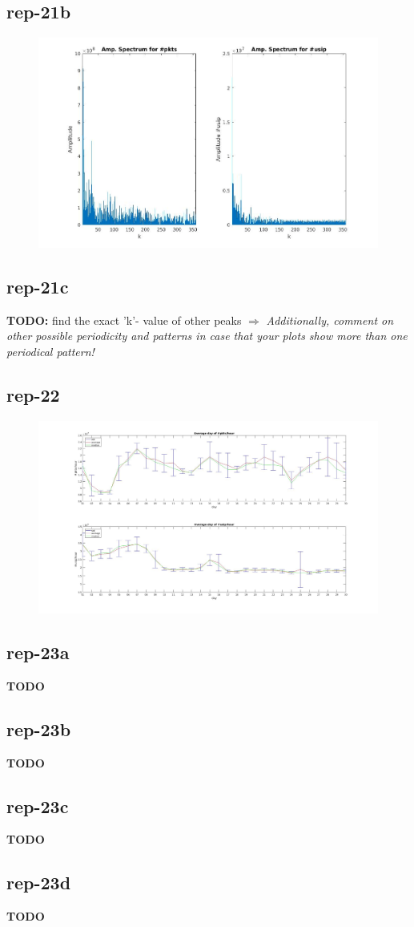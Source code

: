 \subsection*{rep-21b}
\begin{figure}[H]
\center
\includegraphics[width=.7\textwidth]{./chapters/plots/rep21b.jpg}\\
\caption{}
\end{figure}

\subsection*{rep-21c}
\textbf{TODO:} find the exact 'k'- value of other peaks $\Rightarrow$ \textit{Additionally, comment on other possible periodicity and patterns in case that your plots show more than one periodical pattern!}
\subsection*{rep-22}
\begin{figure}[H]
\center
\includegraphics[width=1\textwidth]{./chapters/plots/rep-22.jpg}\\
\caption{}
\end{figure}

\subsection*{rep-23a}
\textbf{TODO}
\subsection*{rep-23b}
\textbf{TODO}
\subsection*{rep-23c}
\textbf{TODO}
\subsection*{rep-23d}
\textbf{TODO}
